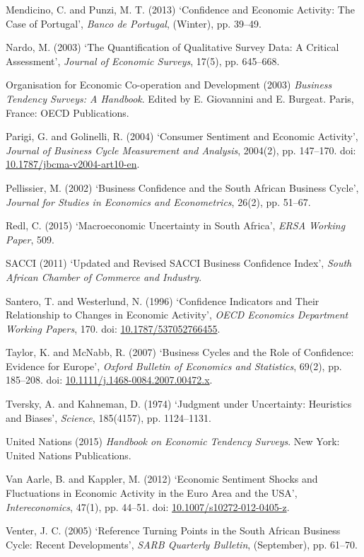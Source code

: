 \documentclass[11pt,]{article}
\begin{document}
\hypertarget{ref-Mendicino2013}{}
Mendicino, C. and Punzi, M. T. (2013) `Confidence and Economic Activity:
The Case of Portugal', \emph{Banco de Portugal}, (Winter), pp. 39--49.

\hypertarget{ref-Nardo2003}{}
Nardo, M. (2003) `The Quantification of Qualitative Survey Data: A
Critical Assessment', \emph{Journal of Economic Surveys}, 17(5), pp.
645--668.

\hypertarget{ref-OECD2003}{}
Organisation for Economic Co-operation and Development (2003)
\emph{Business Tendency Surveys: A Handbook}. Edited by E. Giovannini
and E. Burgeat. Paris, France: OECD Publications.

\hypertarget{ref-Parigi2004}{}
Parigi, G. and Golinelli, R. (2004) `Consumer Sentiment and Economic
Activity', \emph{Journal of Business Cycle Measurement and Analysis},
2004(2), pp. 147--170. doi:
\href{https://doi.org/10.1787/jbcma-v2004-art10-en}{10.1787/jbcma-v2004-art10-en}.

\hypertarget{ref-Pellissier2002}{}
Pellissier, M. (2002) `Business Confidence and the South African
Business Cycle', \emph{Journal for Studies in Economics and
Econometrics}, 26(2), pp. 51--67.

\hypertarget{ref-Redl2015}{}
Redl, C. (2015) `Macroeconomic Uncertainty in South Africa', \emph{ERSA
Working Paper}, 509.

\hypertarget{ref-SACCI2011}{}
SACCI (2011) `Updated and Revised SACCI Business Confidence Index',
\emph{South African Chamber of Commerce and Industry}.

\hypertarget{ref-Santero1996}{}
Santero, T. and Westerlund, N. (1996) `Confidence Indicators and Their
Relationship to Changes in Economic Activity', \emph{OECD Economics
Department Working Papers}, 170. doi:
\href{https://doi.org/10.1787/537052766455}{10.1787/537052766455}.

\hypertarget{ref-Taylor2007}{}
Taylor, K. and McNabb, R. (2007) `Business Cycles and the Role of
Confidence: Evidence for Europe', \emph{Oxford Bulletin of Economics and
Statistics}, 69(2), pp. 185--208. doi:
\href{https://doi.org/10.1111/j.1468-0084.2007.00472.x}{10.1111/j.1468-0084.2007.00472.x}.

\hypertarget{ref-Tversky1974}{}
Tversky, A. and Kahneman, D. (1974) `Judgment under Uncertainty:
Heuristics and Biases', \emph{Science}, 185(4157), pp. 1124--1131.

\hypertarget{ref-UN2015}{}
United Nations (2015) \emph{Handbook on Economic Tendency Surveys}. New
York: United Nations Publications.

\hypertarget{ref-VanAarle2012}{}
Van Aarle, B. and Kappler, M. (2012) `Economic Sentiment Shocks and
Fluctuations in Economic Activity in the Euro Area and the USA',
\emph{Intereconomics}, 47(1), pp. 44--51. doi:
\href{https://doi.org/10.1007/s10272-012-0405-z}{10.1007/s10272-012-0405-z}.

\hypertarget{ref-Venter2005a}{}
Venter, J. C. (2005) `Reference Turning Points in the South African
Business Cycle: Recent Developments', \emph{SARB Quarterly Bulletin},
(September), pp. 61--70.
\end{document}
